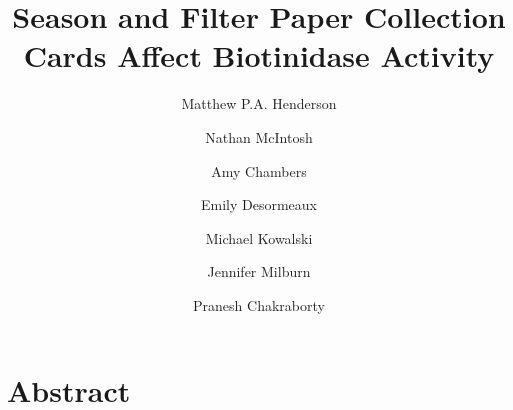 \documentclass[review]{elsarticle}
\date{}
\title{}
\begin{document}
\makeatletter
\newcommand{\citeprocitem}[2]{\hyper@linkstart{cite}{citeproc_bib_item_#1}#2\hyper@linkend}
\makeatother



\begin{frontmatter}
\title{Season and Filter Paper Collection Cards Affect Biotinidase Activity}
\author[NSO]{Matthew P.A. Henderson}
\author[NSO]{Nathan McIntosh}
\author[NSO]{Amy Chambers}
\author[NSO]{Emily Desormeaux}
\author[NSO]{Michael Kowalski}
\author[NSO]{Jennifer Milburn}
\author[NSO]{Pranesh Chakraborty}
\address[NSO]{Newborn Screening Ontario, Children's Hospital of Eastern Ontario, 415 Smyth Rd, Ottawa Ontario}
\end{frontmatter}

\section*{Abstract}
\label{sec:orgad2cbf1}
\end{document}
